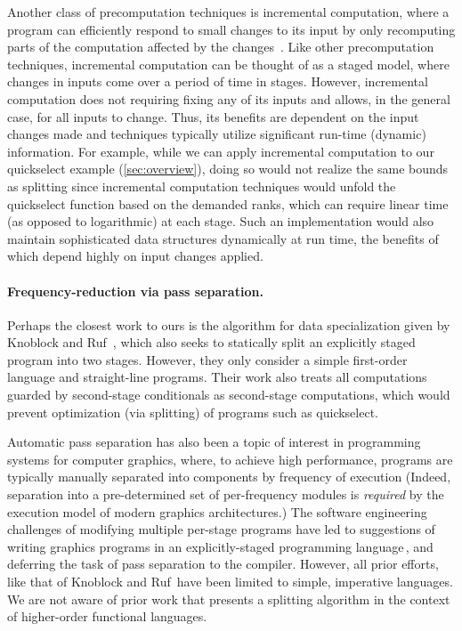 Another class of precomputation techniques is incremental
computation, where a program can efficiently respond to small changes
to its input by only recomputing parts of the computation affected
by the
changes~\cite{DemersReTe81,PughTe89,RamalingamRe93,AcarBlBlHaTa09}.
Like other precomputation techniques, incremental computation can be
thought of as a staged model, where changes in inputs come over a
period of time in stages.
%
However, incremental computation does not requiring fixing any of its
inputs and allows, in the general case, for all inputs to
change. Thus, its benefits are dependent on the input changes made and
techniques typically utilize significant run-time (dynamic)
information.  For example, while we can apply incremental computation
to our quickselect example (\ref{sec:overview}), doing so would not
realize the same bounds as splitting since incremental computation
techniques would unfold the quickselect function based on the demanded
ranks, which can require linear time (as opposed to logarithmic) at
each stage.  Such an implementation would also maintain sophisticated
data structures dynamically at run time, the benefits of which depend
highly on input changes applied.

\paragraph{Frequency-reduction via pass separation.}
Perhaps the closest work to ours is the algorithm for data
specialization given by Knoblock and Ruf~\cite{knoblock96}, which
also seeks to statically split an explicitly staged program into two
stages.  However, they only consider a simple first-order language and
straight-line programs. Their work also treats all computations
guarded by second-stage conditionals as second-stage computations,
which would prevent optimization (via splitting) of programs such as
quickselect.

Automatic pass separation has also been a topic of interest in
programming systems for computer graphics, where, to achieve
high performance, programs are typically manually separated into
components by frequency of execution (Indeed, separation into a pre-determined
set of per-frequency modules is \emph{required} by the execution model
of modern graphics architectures.)  The software engineering
challenges of modifying multiple per-stage programs have led to
suggestions of writing graphics programs in an explicitly-staged
programming language\,\cite{Proudfoot:2001,Foley:2011,He:2014}, and
deferring the task of pass separation to the compiler. However, all
prior efforts, like that of Knoblock and Ruf\,\cite{knoblock96} have
been limited to simple, imperative languages. We are not aware of
prior work that presents a splitting algorithm in the context of
higher-order functional languages.


